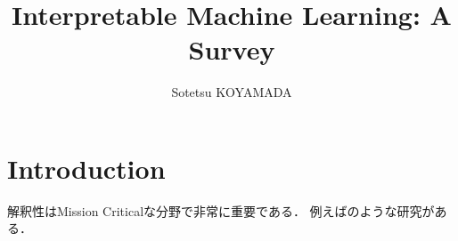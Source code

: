 \documentclass{jsarticle}
\title{Interpretable Machine Learning: A Survey}
\author{Sotetsu KOYAMADA}
\begin{document}
\maketitle

\section{Introduction}
解釈性はMission Criticalな分野で非常に重要である．
例えば\citet{ribeiro2016should}のような研究がある．


\end{document}
